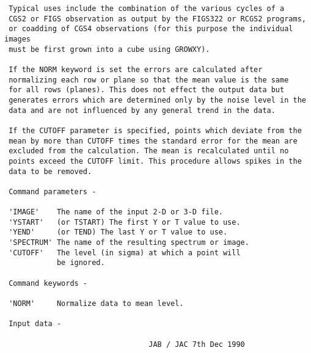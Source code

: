 \begin{description}
\begin{verbatim}
 Typical uses include the combination of the various cycles of a
 CGS2 or FIGS observation as output by the FIGS322 or RCGS2 programs,
 or coadding of CGS4 observations (for this purpose the individual images
 must be first grown into a cube using GROWXY).

 If the NORM keyword is set the errors are calculated after
 normalizing each row or plane so that the mean value is the same
 for all rows (planes). This does not effect the output data but
 generates errors which are determined only by the noise level in the
 data and are not influenced by any general trend in the data.

 If the CUTOFF parameter is specified, points which deviate from the
 mean by more than CUTOFF times the standard error for the mean are
 excluded from the calculation. The mean is recalculated until no
 points exceed the CUTOFF limit. This procedure allows spikes in the
 data to be removed.

 Command parameters -

 'IMAGE'    The name of the input 2-D or 3-D file.
 'YSTART'   (or TSTART) The first Y or T value to use.
 'YEND'     (or TEND) The last Y or T value to use.
 'SPECTRUM' The name of the resulting spectrum or image.
 'CUTOFF'   The level (in sigma) at which a point will
            be ignored.

 Command keywords -

 'NORM'     Normalize data to mean level.

 Input data -

                                 JAB / JAC 7th Dec 1990
\end{verbatim}
\end{description}
